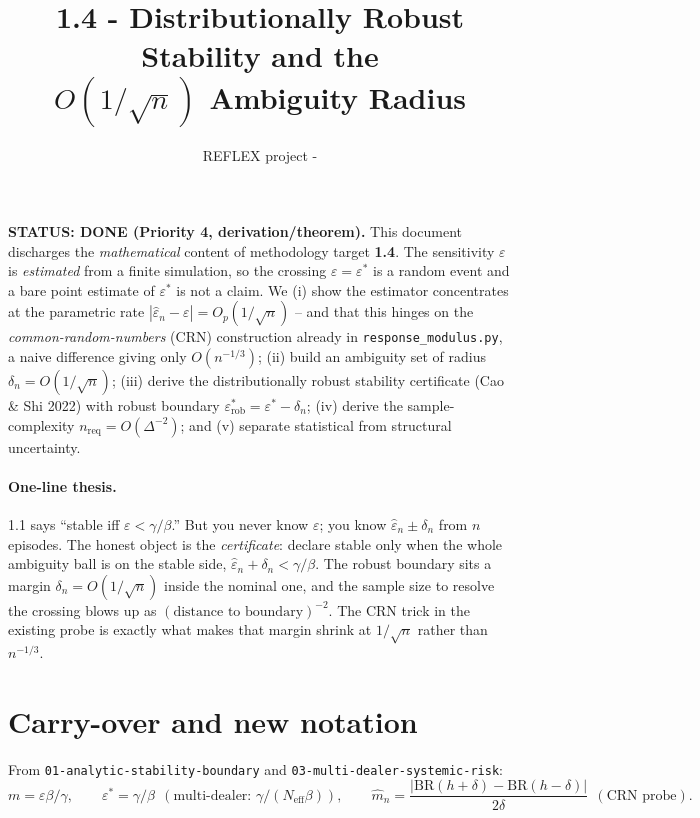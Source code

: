 \documentclass[11pt]{article}
\title{\textbf{1.4 - Distributionally Robust Stability and the\\ $O(1/\sqrt{n})$ Ambiguity Radius}}
\author{REFLEX project - \code{math-theory}}
\date{}
\newcommand{\eps}{\varepsilon}
\newcommand{\epshat}{\hat\eps_n}
\newcommand{\mhat}{\hat m_n}
\newcommand{\dn}{\delta_n}
\newcommand{\Neff}{N_{\mathrm{eff}}}
\newcommand{\code}[1]{\texttt{#1}}
\newcommand{\BR}{\mathrm{BR}}
\newcommand{\epsstar}{\eps^{*}}
\newcommand{\epsrob}{\eps^{*}_{\mathrm{rob}}}
\begin{document}
\maketitle

\noindent\textbf{STATUS: DONE (Priority 4, derivation/theorem).} This document
discharges the \emph{mathematical} content of methodology target \textbf{1.4}. The
sensitivity $\eps$ is \emph{estimated} from a finite simulation, so the crossing
$\eps=\epsstar$ is a random event and a bare point estimate of $\epsstar$ is not a
claim. We (i) show the estimator concentrates at the parametric rate
$|\epshat-\eps|=O_p(1/\sqrt{n})$ -- and that this hinges on the
\emph{common-random-numbers} (CRN) construction already in
\code{response\_modulus.py}, a naive difference giving only $O(n^{-1/3})$;
(ii) build an ambiguity set of radius $\dn=O(1/\sqrt{n})$; (iii) derive the
distributionally robust stability certificate (Cao \& Shi 2022) with robust boundary
$\epsrob=\epsstar-\dn$; (iv) derive the sample-complexity $n_{\mathrm{req}}=O(\Delta^{-2})$;
and (v) separate statistical from structural uncertainty.

\paragraph{One-line thesis.}
1.1 says ``stable iff $\eps<\gamma/\beta$.'' But you never know $\eps$; you know
$\epshat\pm\dn$ from $n$ episodes. The honest object is the \emph{certificate}:
declare stable only when the whole ambiguity ball is on the stable side,
$\epshat+\dn<\gamma/\beta$. The robust boundary sits a margin $\dn=O(1/\sqrt{n})$
inside the nominal one, and the sample size to resolve the crossing blows up as
$(\text{distance to boundary})^{-2}$. The CRN trick in the existing probe is exactly
what makes that margin shrink at $1/\sqrt{n}$ rather than $n^{-1/3}$.

\section{Carry-over and new notation}

From \code{01-analytic-stability-boundary} and \code{03-multi-dealer-systemic-risk}:
%
\[
  m=\eps\beta/\gamma,\qquad \epsstar=\gamma/\beta\ \ (\text{multi-dealer: }\gamma/(\Neff\beta)),
  \qquad \mhat=\frac{|\BR(h+\delta)-\BR(h-\delta)|}{2\delta}\ \ (\text{CRN probe}).
\]
\end{document}
